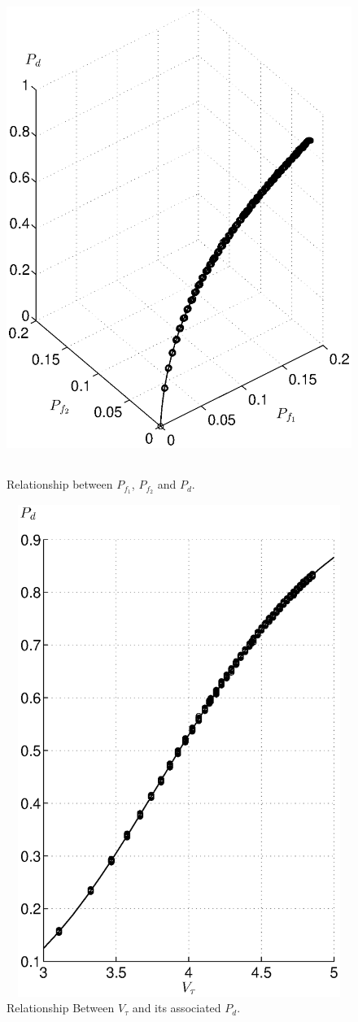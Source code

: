 \begin{figure}[!t]
\centering
\includegraphics[width=12cm, height=16cm]{4/pdpf1pf2.eps}
\caption{Relationship between $P_{f_1}$, $P_{f_2}$ and $P_d$.}
\label{pic:2015may1a1}
\end{figure}

\begin{figure}[!t]
\centering
\includegraphics[width=12cm, height=16cm]{4/tpd.eps}
\caption{Relationship Between $V_\tau$ and its associated $P_d$.}
\label{pic:2015may1a0}
\end{figure}
